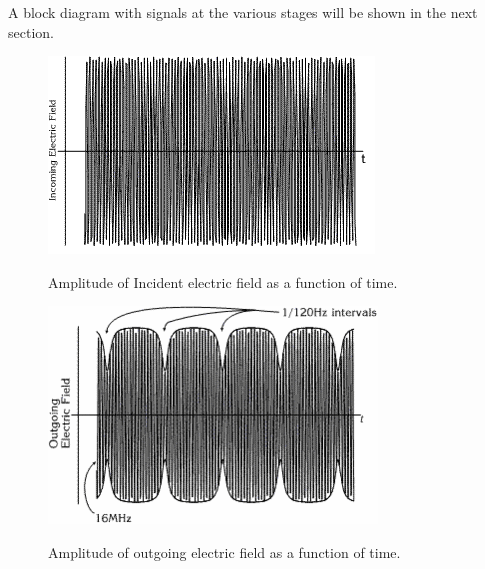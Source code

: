 \documentclass{../lab}
\begin{document}
A block diagram with signals at the various stages will be shown in the next section.

\begin{figure}[H]
\begin{minipage}[t]{0.49\textwidth}
    \href{http://experimentationlab.berkeley.edu/sites/default/files/images/NMR7.gif}{\includegraphics[width=0.9\linewidth,keepaspectratio]{images/NMR7.png}}
    \caption{Amplitude of Incident electric field as a function of time.}
    \label{fig:AmplitudeOfIncidentElectricField}
\end{minipage}\hfill
\begin{minipage}[t]{0.49\textwidth}
    \href{http://experimentationlab.berkeley.edu/sites/default/files/images/330px-NMR8.gif}{\includegraphics[width=0.9\linewidth,keepaspectratio]{images/330px-NMR8.png}}
    \caption{Amplitude of outgoing electric field as a function of time.}
    \label{fig:AmplitudeOfOutgoingElectricField}
\end{minipage}
\end{figure}

\newpage
\end{document}
